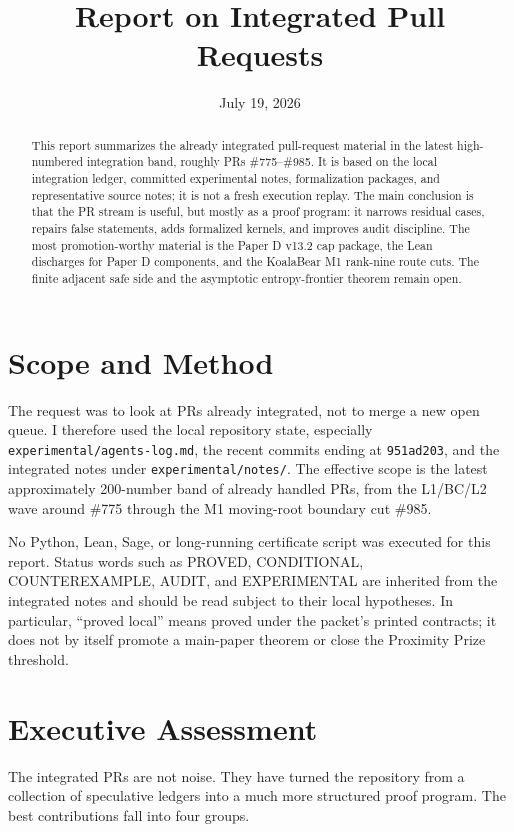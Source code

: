 \documentclass[a4paper,11pt]{amsart}
\title{Report on Integrated Pull Requests}
\date{July 19, 2026}
\begin{document}
\maketitle

\begin{abstract}
This report summarizes the already integrated pull-request material in the
latest high-numbered integration band, roughly PRs \#775--\#985.  It is based
on the local integration ledger, committed experimental notes, formalization
packages, and representative source notes; it is not a fresh execution replay.
The main conclusion is that the PR stream is useful, but mostly as a proof
program: it narrows residual cases, repairs false statements, adds formalized
kernels, and improves audit discipline.  The most promotion-worthy material is
the Paper D v13.2 cap package, the Lean discharges for Paper D components, and
the KoalaBear M1 rank-nine route cuts.  The finite adjacent safe side and the
asymptotic entropy-frontier theorem remain open.
\end{abstract}

\section{Scope and Method}

The request was to look at PRs already integrated, not to merge a new open
queue.  I therefore used the local repository state, especially
\texttt{experimental/agents-log.md}, the recent commits ending at
\texttt{951ad203}, and the integrated notes under \texttt{experimental/notes/}.
The effective scope is the latest approximately 200-number band of already
handled PRs, from the L1/BC/L2 wave around \#775 through the M1 moving-root
boundary cut \#985.

No Python, Lean, Sage, or long-running certificate script was executed for this
report.  Status words such as PROVED, CONDITIONAL, COUNTEREXAMPLE, AUDIT, and
EXPERIMENTAL are inherited from the integrated notes and should be read subject
to their local hypotheses.  In particular, ``proved local'' means proved under
the packet's printed contracts; it does not by itself promote a main-paper
theorem or close the Proximity Prize threshold.

\section{Executive Assessment}

The integrated PRs are not noise.  They have turned the repository from a
collection of speculative ledgers into a much more structured proof program.
The best contributions fall into four groups.
\end{document}
